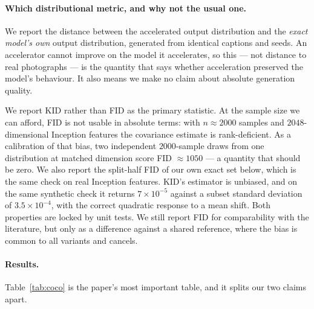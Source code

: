 \paragraph{Which distributional metric, and why not the usual one.} We report the
distance between the accelerated output distribution and the \emph{exact model's own}
output distribution, generated from identical captions and seeds. An accelerator cannot
improve on the model it accelerates, so this --- not distance to real photographs --- is
the quantity that says whether acceleration preserved the model's behaviour. It also
means we make no claim about absolute generation quality.

We report KID rather than FID as the primary statistic. At the sample size we can
afford, FID is not usable in absolute terms: with $n\!\approx\!2000$ samples and
$2048$-dimensional Inception features the covariance estimate is rank-deficient. As a
calibration of that bias, two independent $2000$-sample draws from one distribution at
matched dimension score FID $\approx\!1050$ --- a quantity that should be zero. We also
report the split-half FID of our own exact set below, which is the same check on real
Inception features. KID's estimator is unbiased, and on the same
synthetic check it returns $7\times10^{-5}$ against a subset standard deviation of
$3.5\times10^{-4}$, with the correct quadratic response to a mean shift. Both
properties are locked by unit tests. We still report FID for comparability with the
literature, but only as a difference against a shared reference, where the bias is
common to all variants and cancels.

\paragraph{Results.} Table~\ref{tab:coco} is the paper's most important table, and it
splits our two claims apart.

